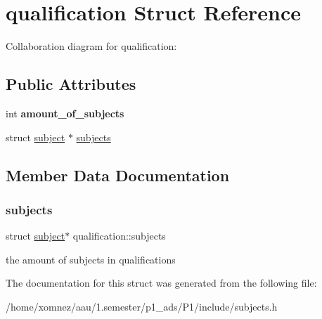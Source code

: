 \hypertarget{structqualification}{}\section{qualification Struct Reference}
\label{structqualification}


Collaboration diagram for qualification\+:
\subsection*{Public Attributes}
\begin{DoxyCompactItemize}
\item 
\mbox{\label{structqualification_a4eb2ae542b852c954bd4a6e6eca1fb87}} 
int {\bfseries amount\+\_\+of\+\_\+subjects}
\item 
struct \hyperlink{structsubject}{subject} $\ast$ \hyperlink{structqualification_aaa12bc20ddf86ab9297ab4dd06cd774f}{subjects}
\end{DoxyCompactItemize}


\subsection{Member Data Documentation}
\mbox{\label{structqualification_aaa12bc20ddf86ab9297ab4dd06cd774f}} 
\subsubsection{\texorpdfstring{subjects}{subjects}}
{\footnotesize\ttfamily struct \hyperlink{structsubject}{subject}$\ast$ qualification\+::subjects}

the amount of subjects in qualifications 

The documentation for this struct was generated from the following file\+:\begin{DoxyCompactItemize}
\item 
/home/xomnez/aau/1.\+semester/p1\+\_\+ads/\+P1/include/subjects.\+h\end{DoxyCompactItemize}
